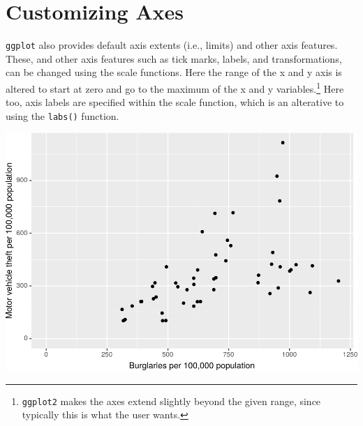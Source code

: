 \documentclass[]{krantz}
\makeatletter
\newenvironment{Shaded}{\begin{snugshade}}{\end{snugshade}}
\newcommand{\DataTypeTok}[1]{\textcolor[rgb]{0.27,0.27,0.27}{#1}}
\newcommand{\DecValTok}[1]{\textcolor[rgb]{0.06,0.06,0.06}{#1}}
\newcommand{\KeywordTok}[1]{\textcolor[rgb]{0.27,0.27,0.27}{\textbf{#1}}}
\newcommand{\NormalTok}[1]{#1}
\newcommand{\OperatorTok}[1]{\textcolor[rgb]{0.43,0.43,0.43}{\textbf{#1}}}
\newcommand{\StringTok}[1]{\textcolor[rgb]{0.5,0.5,0.5}{#1}}
\newenvironment{kframe}{%
\medskip{}
\setlength{\fboxsep}{.8em}
 \def\at@end@of@kframe{}%
 \ifinner\ifhmode%
  \def\at@end@of@kframe{\end{minipage}}%
  \begin{minipage}{\columnwidth}%
 \fi\fi%
 \def\FrameCommand##1{\hskip\@totalleftmargin \hskip-\fboxsep
 \colorbox{shadecolor}{##1}\hskip-\fboxsep
     \hskip-\linewidth \hskip-\@totalleftmargin \hskip\columnwidth}%
 \MakeFramed {\advance\hsize-\width
   \@totalleftmargin\z@ \linewidth\hsize
   \@setminipage}}%
 {\par\unskip\endMakeFramed%
 \at@end@of@kframe}
\renewenvironment{Shaded}{\begin{kframe}}{\end{kframe}}
\makeatother
\begin{document}
\hypertarget{customizing-axes}{%
\section{Customizing Axes}\label{customizing-axes}}

\texttt{ggplot} also provides default axis extents (i.e., limits) and other axis features. These, and other axis features such as tick marks, labels, and transformations, can be changed using the scale functions. Here the range of the x and y axis is altered to start at zero and go to the maximum of the x and y variables.\footnote{\texttt{ggplot2} makes the axes extend slightly beyond the given range, since typically this is what the user wants.} Here too, axis labels are specified within the scale function, which is an alterative to using the \texttt{labs()} function.

\begin{Shaded}
\end{Shaded}

\includegraphics{bookdown_files/figure-latex/unnamed-chunk-69-1.pdf}
\end{document}
